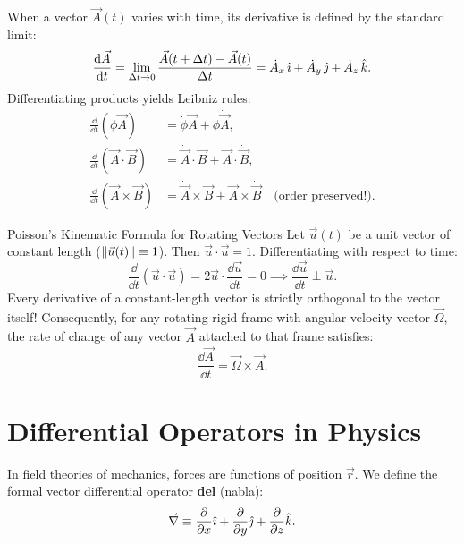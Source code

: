 When a vector $\vec{A}(t)$ varies with time, its derivative is defined by the standard limit:
\[
\frac{\mathrm{d}\vec{A}}{\mathrm{d} t} = \lim_{\Delta t \to 0} \frac{\vec{A}(t + \Delta t) - \vec{A}(t)}{\Delta t} = \dot{A}_x\,\hat{\imath} + \dot{A}_y\,\hat{\jmath} + \dot{A}_z\,\hat{k}.
\]
Differentiating products yields Leibniz rules:
\begin{align*}
\frac{\dd}{\dd t}(\phi\vec{A}) &= \dot{\phi}\vec{A} + \phi\dot{\vec{A}}, \\
\frac{\dd}{\dd t}(\vec{A}\cdot\vec{B}) &= \dot{\vec{A}}\cdot\vec{B} + \vec{A}\cdot\dot{\vec{B}}, \\
\frac{\dd}{\dd t}(\vec{A}\times\vec{B}) &= \dot{\vec{A}}\times\vec{B} + \vec{A}\times\dot{\vec{B}} \quad \text{(order preserved!).}
\end{align*}

\begin{lawbox}{Poisson's Kinematic Formula for Rotating Vectors}
Let $\vec{u}(t)$ be a unit vector of constant length ($\left\lVert \vec{u}(t) \right\rVert \equiv 1$).
Then $\vec{u}\cdot\vec{u} = 1$. Differentiating with respect to time:
\[
\frac{\dd}{\dd t}(\vec{u}\cdot\vec{u}) = 2\vec{u}\cdot\frac{\dd\vec{u}}{\dd t} = 0 \implies \frac{\dd\vec{u}}{\dd t} \perp \vec{u}.
\]
Every derivative of a constant-length vector is strictly orthogonal to the vector itself!
Consequently, for any rotating rigid frame with angular velocity vector $\vec{\Omega}$, the rate of change of any vector $\vec{A}$ attached to that frame satisfies:
\[
\boxed{\frac{\dd\vec{A}}{\dd t} = \vec{\Omega}\times\vec{A}.}
\]
\end{lawbox}

\section{Differential Operators in Physics}

In field theories of mechanics, forces are functions of position $\vec{r}$. We define the formal vector differential operator \textbf{del} (nabla):
\[
\vec{\nabla} \equiv \frac{\partial}{\partial x}\hat{\imath} + \frac{\partial}{\partial y}\hat{\jmath} + \frac{\partial}{\partial z}\hat{k}.
\]

